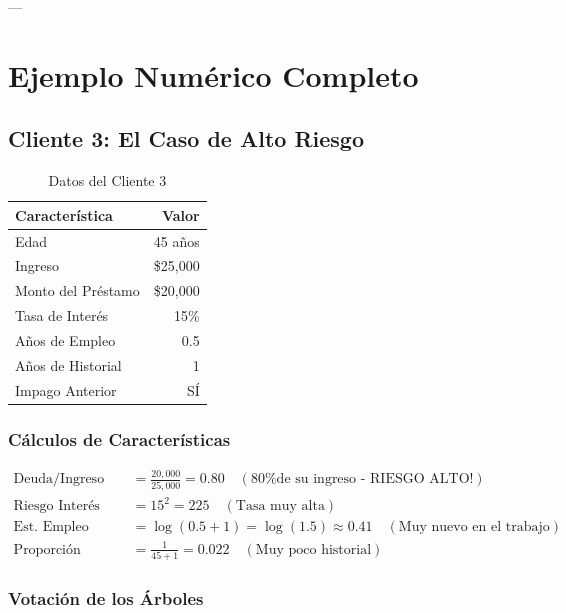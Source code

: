 \documentclass[11pt,a4paper,spanish]{article}
\begin{document}
---

\section{Ejemplo Numérico Completo}

\subsection{Cliente 3: El Caso de Alto Riesgo}

\begin{table}[H]
\centering
\begin{tabular}{|l|r|}
\hline
\textbf{Característica} & \textbf{Valor} \\
\hline
Edad & 45 años \\
Ingreso & \$25,000 \\
Monto del Préstamo & \$20,000 \\
Tasa de Interés & 15\% \\
Años de Empleo & 0.5 \\
Años de Historial & 1 \\
Impago Anterior & SÍ \\
\hline
\end{tabular}
\caption{Datos del Cliente 3}
\end{table}

\subsubsection{Cálculos de Características}

\begin{align*}
\text{Deuda/Ingreso} &= \frac{20,000}{25,000} = 0.80 \quad (\text{80\% de su ingreso - RIESGO ALTO!})\\
\text{Riesgo Interés} &= 15^2 = 225 \quad (\text{Tasa muy alta})\\
\text{Est. Empleo} &= \log(0.5 + 1) = \log(1.5) \approx 0.41 \quad (\text{Muy nuevo en el trabajo})\\
\text{Proporción Historial} &= \frac{1}{45 + 1} = 0.022 \quad (\text{Muy poco historial})
\end{align*}

\subsubsection{Votación de los Árboles}
\end{document}
